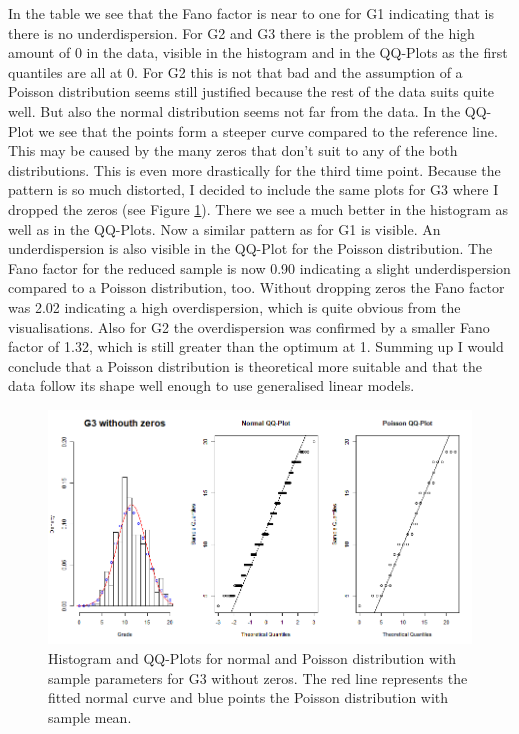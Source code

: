 In the table we see that the Fano factor is near to one for G1 indicating that is there is no underdispersion. For G2 and G3 there is the problem of the high amount of 0 in the data, visible in the histogram and in the QQ-Plots as the first quantiles are all at 0. For G2 this is not that bad and the assumption of a Poisson distribution seems still justified because the rest of the data suits quite well. But also the normal distribution seems not far from the data. In the QQ-Plot we see that the points form a steeper curve compared to the reference line. This may be caused by the many zeros that don't suit to any of the both distributions. This is even more drastically for the third time point. Because the pattern is so much distorted, I decided to include the same plots for G3 where I dropped the zeros (see Figure \ref{4gradedist2}). There we see a much better in the histogram as well as in the QQ-Plots. Now a similar pattern as for G1 is visible. An underdispersion is also visible in the QQ-Plot for the Poisson distribution. The Fano factor for the reduced sample is now 0.90 indicating a slight underdispersion compared to a Poisson distribution, too. Without dropping zeros the Fano factor was 2.02 indicating a high overdispersion, which is quite obvious from the visualisations. Also for G2 the overdispersion was confirmed by a smaller Fano factor of 1.32, which is still greater than the optimum at 1. Summing up I would conclude that a Poisson distribution is theoretical more suitable and that the data follow its shape well enough to use generalised linear models.
\begin{figure}[thb]
\centering
\includegraphics[width=\textwidth, keepaspectratio]{ex7/gradedist2.png}
\caption{Histogram and QQ-Plots for normal and Poisson distribution with sample parameters for G3 without zeros. The red line represents the fitted normal curve and blue points the Poisson distribution with sample mean.}
\label{4gradedist2}
\end{figure}	

